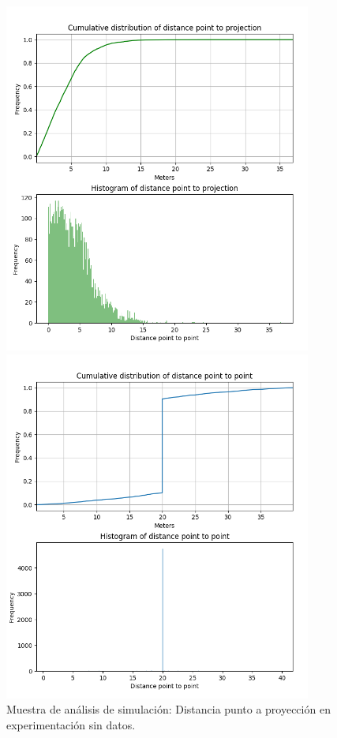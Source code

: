 \begin{figure}[!htb]
\begin{minipage}{0.48\textwidth}
\centering
\includegraphics[width=0.9\textwidth]{./Imagenes/SimulateCumulativePointProjectionEmpty.png}
\caption{Muestra de análisis de simulación: Distancia punto a proyección en experimentación sin datos.}
\label{figure:SimulatedPointToProjectionEmpty}
\end{minipage}\hfill
\begin{minipage}{0.48\textwidth}
\centering
\includegraphics[width=0.9\textwidth]{./Imagenes/SimulateCumulativePointPointEmpty.png}

\end{minipage}
\end{figure}
